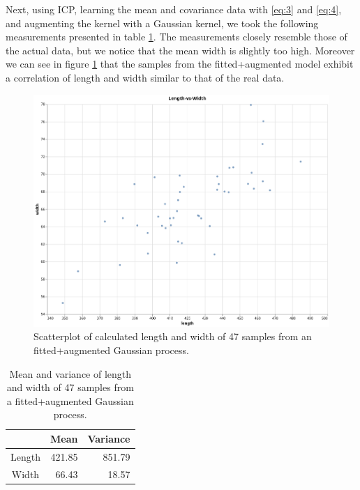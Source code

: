 \documentclass[10pt]{article}
\theoremstyle{definition}
\begin{document}
Next, using ICP, learning the mean and covariance data with \eqref{eq:3} and \eqref{eq:4}, and augmenting the kernel with a Gaussian kernel, we took the following measurements presented in table \ref{table:mean_variance_fitted_augmented}. The measurements closely resemble those of the actual data, but we notice that the mean width is slightly too high. Moreover we can see in figure \ref{fig:scatterplot_fitted_augmented} that the samples from the fitted+augmented model exhibit a correlation of length and width similar to that of the real data.
\begin{figure}[h!]
\centering
\includegraphics[scale=0.35]{screenshots/fitted_augmented_scatterplot.png}
\caption{Scatterplot of calculated length and width of 47 samples from an fitted+augmented Gaussian process.}
\label{fig:scatterplot_fitted_augmented}
\end{figure}
\begin{table}[h!]
\centering
\begin{tabular}{c|r|r}
 & Mean & Variance \\
\hline
Length & 421.85 & 851.79 \\
Width & 66.43 & 18.57
\end{tabular}
\caption{Mean and variance of length and width of 47 samples from a fitted+augmented Gaussian process.}
\label{table:mean_variance_fitted_augmented}
\end{table}
\end{document}
